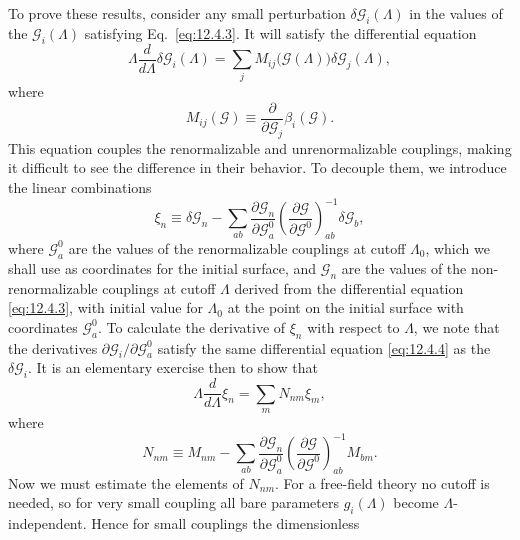 To prove these results, consider any small perturbation $\delta\mathcal
G_i(\Lambda)$ in the values of the $\mathcal G_i(\Lambda)$ satisfying
Eq.~\eqref{eq:12.4.3}. It will satisfy the differential equation
\begin{equation}
\Lambda\frac{d}{d\Lambda}\delta\mathcal G_i(\Lambda)
=\sum_j M_{ij}\bigl(\mathcal G(\Lambda)\bigr)\delta\mathcal G_j(\Lambda),
\tag{12.4.4}\label{eq:12.4.4}
\end{equation}
where
\begin{equation}
M_{ij}(\mathcal G)\equiv\frac{\partial}{\partial\mathcal G_j}\beta_i(\mathcal G).
\tag{12.4.5}\label{eq:12.4.5}
\end{equation}
This equation couples the renormalizable and unrenormalizable couplings, making
it difficult to see the difference in their behavior. To decouple them, we
introduce the linear combinations
\begin{equation}
\xi_n\equiv\delta\mathcal G_n-
\sum_{ab}\frac{\partial\mathcal G_n}{\partial\mathcal G_a^0}
\left(\frac{\partial\mathcal G}{\partial\mathcal G^0}\right)^{-1}_{ab}
\delta\mathcal G_b,
\tag{12.4.6}\label{eq:12.4.6}
\end{equation}
where $\mathcal G_a^0$ are the values of the renormalizable couplings at cutoff
$\Lambda_0$, which we shall use as coordinates for the initial surface, and
$\mathcal G_n$ are the values of the non-renormalizable couplings at cutoff
$\Lambda$ derived from the differential equation \eqref{eq:12.4.3}, with
initial value for $\Lambda_0$ at the point on the initial surface with
coordinates $\mathcal G_a^0$. To calculate the derivative of $\xi_n$ with
respect to $\Lambda$, we note that the derivatives
$\partial\mathcal G_i/\partial\mathcal G_a^0$ satisfy the same differential
equation \eqref{eq:12.4.4} as the $\delta\mathcal G_i$. It is an elementary
exercise then to show that
\begin{equation}
\Lambda\frac{d}{d\Lambda}\xi_n=\sum_m N_{nm}\xi_m,
\tag{12.4.7}\label{eq:12.4.7}
\end{equation}
where
\begin{equation}
N_{nm}\equiv M_{nm}-\sum_{ab}
\frac{\partial\mathcal G_n}{\partial\mathcal G_a^0}
\left(\frac{\partial\mathcal G}{\partial\mathcal G^0}\right)^{-1}_{ab}M_{bm}.
\tag{12.4.8}\label{eq:12.4.8}
\end{equation}
Now we must estimate the elements of $N_{nm}$. For a free-field theory no
cutoff is needed, so for very small coupling all bare parameters $g_i(\Lambda)$
become $\Lambda$-independent. Hence for small couplings the dimensionless
